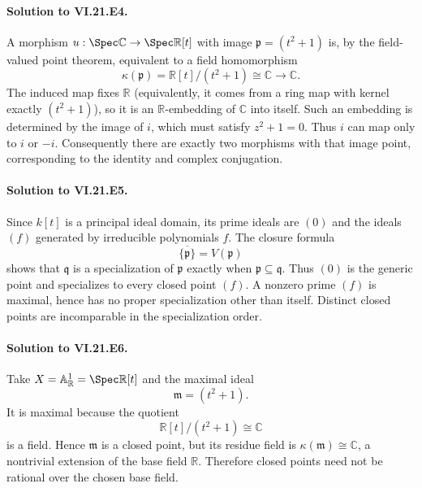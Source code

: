 \paragraph{Solution to VI.21.E4.}
\begin{solution}
A morphism $u:\Spec\mathbb C\to\Spec\mathbb R[t]$ with image
$\mathfrak p=(t^2+1)$ is, by the field-valued point theorem, equivalent to a field homomorphism
\[
\kappa(\mathfrak p)=\mathbb R[t]/(t^2+1)\cong\mathbb C\longrightarrow\mathbb C.
\]
The induced map fixes $\mathbb R$ (equivalently, it comes from a ring map with kernel exactly
$(t^2+1)$), so it is an $\mathbb R$-embedding of $\mathbb C$ into itself.  Such an embedding is
determined by the image of $i$, which must satisfy $z^2+1=0$.  Thus $i$ can map only to $i$ or
$-i$.  Consequently there are exactly two morphisms with that image point, corresponding to the
identity and complex conjugation.
\end{solution}

\paragraph{Solution to VI.21.E5.}
\begin{solution}
Since $k[t]$ is a principal ideal domain, its prime ideals are $(0)$ and the ideals
$(f)$ generated by irreducible polynomials $f$.  The closure formula
\[
\overline{\{\mathfrak p\}}=V(\mathfrak p)
\]
shows that $\mathfrak q$ is a specialization of $\mathfrak p$ exactly when
$\mathfrak p\subseteq\mathfrak q$.  Thus $(0)$ is the generic point and specializes to every
closed point $(f)$.  A nonzero prime $(f)$ is maximal, hence has no proper specialization other
than itself.  Distinct closed points are incomparable in the specialization order.
\end{solution}

\paragraph{Solution to VI.21.E6.}
\begin{solution}
Take $X=\mathbb A^1_{\mathbb R}=\Spec\mathbb R[t]$ and the maximal ideal
\[
\mathfrak m=(t^2+1).
\]
It is maximal because the quotient
\[
\mathbb R[t]/(t^2+1)\cong\mathbb C
\]
is a field.  Hence $\mathfrak m$ is a closed point, but its residue field is
$\kappa(\mathfrak m)\cong\mathbb C$, a nontrivial extension of the base field $\mathbb R$.
Therefore closed points need not be rational over the chosen base field.
\end{solution}

